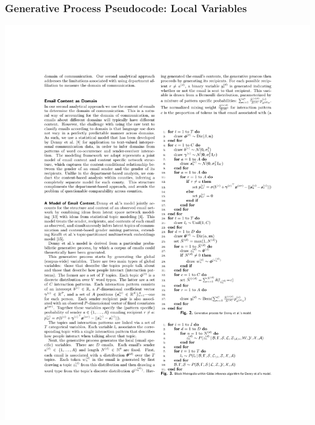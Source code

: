 \documentclass[xcolor={table}, fleqn]{beamer}
\newenvironment{changemargin}[2]{%
  \begin{list}{}{%
    \setlength{\topsep}{0pt}%
    \setlength{\leftmargin}{#1}%
    \setlength{\rightmargin}{#2}%
    \setlength{\listparindent}{\parindent}%
    \setlength{\itemindent}{\parindent}%
    \setlength{\parsep}{\parskip}%
  }%
  \item[]}{\end{list}}
\begin{document}
\begin{frame}\frametitle{Generative Process Pseudocode: Local Variables}
	\begin{changemargin}{-1cm}{ -1cm}
    \centering
	\includegraphics[width=.88\textwidth]{images/Pseudocode2.pdf}
	\end{changemargin} 
\end{frame}
\end{document}
